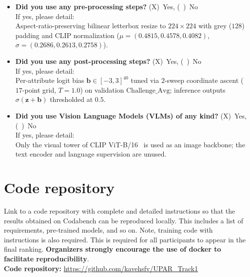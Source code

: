 \documentclass[a4paper, 10pt, conference]{ieeeconf}
\begin{document}
\begin{itemize}
\item \textbf{Did you use any pre-processing steps?} (X)~Yes, (~)~No\\
If yes, please detail:\\
%
Aspect-ratio-preserving bilinear letterbox resize to $224\times224$ with grey ($128$) padding and CLIP normalization ($\mu=(0.4815, 0.4578, 0.4082)$, $\sigma=(0.2686, 0.2613, 0.2758)$).

\item \textbf{Did you use any post-processing steps?} (X)~Yes, (~)~No\\
If yes, please detail:\\
%
Per-attribute logit bias $\mathbf{b}\in[-3,3]^{40}$ tuned via $2$-sweep coordinate ascent ($17$-point grid, $T=1.0$) on validation $\text{Challenge\_Avg}$; inference outputs $\sigma(\mathbf{z}+\mathbf{b})$ thresholded at $0.5$.

\item \textbf{Did you use Vision Language Models (VLMs) of any kind?} (X)~Yes, (~)~No\\
If yes, please detail:\\
%
Only the visual tower of CLIP ViT-B/16~\cite{radford2021clip} is used as an image backbone; the text encoder and language supervision are unused.
\end{itemize}


\section{Code repository}
Link to a code repository with complete and detailed instructions so that the results obtained on Codabench can be reproduced locally. This includes a list of requirements, pre-trained models, and so on. Note, training code with instructions is also required. This is required for all participants to appear in the final ranking. \textbf{Organizers strongly encourage the use of docker to facilitate reproducibility}. \\

\textbf{Code repository:} \url{https://github.com/kavehsfv/UPAR_Track1}




\end{document}
